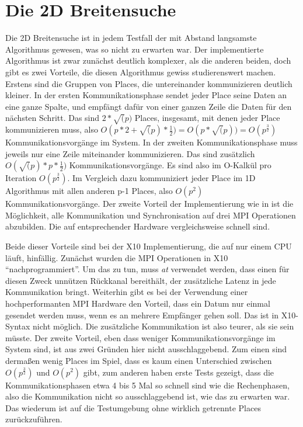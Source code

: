 




\section{Die 2D Breitensuche} %
\label{sec:die_2d_breitensuche}
Die 2D Breitensuche ist in jedem Testfall der mit Abstand langsamste Algorithmus gewesen, was so nicht zu erwarten war. Der implementierte Algorithmus ist zwar zunächst deutlich komplexer, als die anderen beiden, doch gibt es zwei Vorteile, die diesen Algorithmus gewiss studierenswert machen. Erstens sind die Gruppen von Places, die untereinander kommunizieren deutlich kleiner. In der ersten Kommunikationsphase sendet jeder Place seine Daten an eine ganze Spalte, und empfängt dafür von einer ganzen Zeile die Daten für den nächsten Schritt. Das sind $2 * \sqrt(p)$ Places, insgesamt, mit denen jeder Place kommunizieren muss, also $O(p * 2 + \sqrt(p) * \frac{1}{2}) = O(p * \sqrt(p))= O(p^{\frac{3}{2}})$ Kommunikationsvorgänge im System. In der zweiten Kommunikationsphase muss jeweils nur eine Zeile miteinander kommunizieren. Das sind zusätzlich $O(\sqrt(p) * p * \frac{1}{2})$ Kommunikationsvorgänge. Es sind also im O-Kalkül pro Iteration $O(p^{\frac{3}{2}})$. Im Vergleich dazu kommuniziert jeder Place im 1D Algorithmus mit allen anderen p-1 Places, also $O(p^2)$ Kommunikationsvorgänge. Der zweite Vorteil der Implementierung wie in \cite{Buluc:2011} ist die Möglichkeit, alle Kommunikation und Synchronisation auf drei MPI Operationen abzubilden. Die auf entsprechender Hardware vergleichsweise schnell sind. 

Beide dieser Vorteile sind bei der X10 Implementierung, die auf nur einem CPU läuft, hinfällig. Zunächst wurden die MPI Operationen in X10 \enquote{nachprogrammiert}. Um das zu tun, muss \textit{at} verwendet werden, dass einen für diesen Zweck unnützen Rückkanal bereithält, der zusätzliche Latenz in jede Kommunikation bringt. Weiterhin gibt es bei der Verwendung einer hochperformanten MPI Hardware den Vorteil, dass ein Datum nur einmal gesendet werden muss, wenn es an mehrere Empfänger gehen soll. Das ist in X10-Syntax nicht möglich. Die zusätzliche Kommunikation ist also teurer, als sie sein müsste. 
Der zweite Vorteil, eben dass weniger Kommunikationsvorgänge im System sind, ist aus zwei Gründen hier nicht ausschlaggebend. Zum einen sind dermaßen wenig Places im Spiel, dass es kaum einen Unterschied zwischen $O(p^{\frac{3}{2}})$ und $O(p^2)$ gibt, zum anderen haben erste Tests gezeigt, dass die Kommunikationsphasen etwa 4 bis 5 Mal so schnell sind wie die Rechenphasen, also die Kommunikation nicht so ausschlaggebend ist, wie das zu erwarten war. Das wiederum ist auf die Testumgebung ohne wirklich getrennte Places zurückzuführen.

